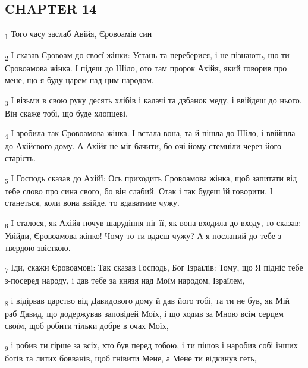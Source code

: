 \subsection{CHAPTER 14}
\begin{tcolorbox}
\textsubscript{1} Того часу заслаб Авійя, Єровоамів син
\end{tcolorbox}
\begin{tcolorbox}
\textsubscript{2} І сказав Єровоам до своєї жінки: Устань та переберися, і не пізнають, що ти Єровоамова жінка. І підеш до Шіло, ото там пророк Ахійя, який говорив про мене, що я буду царем над цим народом.
\end{tcolorbox}
\begin{tcolorbox}
\textsubscript{3} І візьми в свою руку десять хлібів і калачі та дзбанок меду, і ввійдеш до нього. Він скаже тобі, що буде хлопцеві.
\end{tcolorbox}
\begin{tcolorbox}
\textsubscript{4} І зробила так Єровоамова жінка. І встала вона, та й пішла до Шіло, і ввійшла до Ахійєвого дому. А Ахійя не міг бачити, бо очі йому стемніли через його старість.
\end{tcolorbox}
\begin{tcolorbox}
\textsubscript{5} І Господь сказав до Ахійї: Ось приходить Єровоамова жінка, щоб запитати від тебе слово про сина свого, бо він слабий. Отак і так будеш їй говорити. І станеться, коли вона ввійде, то вдаватиме чужу.
\end{tcolorbox}
\begin{tcolorbox}
\textsubscript{6} І сталося, як Ахійя почув шарудіння ніг її, як вона входила до входу, то сказав: Увійди, Єровоамова жінко! Чому то ти вдаєш чужу? А я посланий до тебе з твердою звісткою.
\end{tcolorbox}
\begin{tcolorbox}
\textsubscript{7} Іди, скажи Єровоамові: Так сказав Господь, Бог Ізраїлів: Тому, що Я підніс тебе з-посеред народу, і дав тебе за князя над Моїм народом, Ізраїлем,
\end{tcolorbox}
\begin{tcolorbox}
\textsubscript{8} і відірвав царство від Давидового дому й дав його тобі, та ти не був, як Мій раб Давид, що додержував заповідей Моїх, і що ходив за Мною всім серцем своїм, щоб робити тільки добре в очах Моїх,
\end{tcolorbox}
\begin{tcolorbox}
\textsubscript{9} і робив ти гірше за всіх, хто був перед тобою, і ти пішов і наробив собі інших богів та литих бовванів, щоб гнівити Мене, а Мене ти відкинув геть,
\end{tcolorbox}

